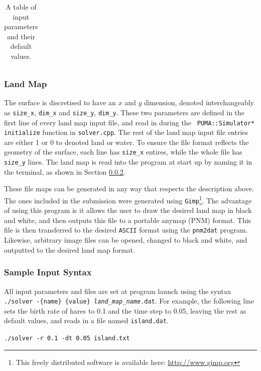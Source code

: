 \documentclass[a4paper,11pt]{article}
\begin{document}
{\begin{table}
\begin{tabular}{|l|l|l|l|}
\end{tabular}
\caption{A table of input parameters and their default values.}
\label{tb:parameters}
\end{table}


\subsubsection{Land Map}

The surface is discretised to have an $x$ and $y$ dimension, denoted interchangeably as \texttt{size\_x}, \texttt{dim\_x} and \texttt{size\_y}, \texttt{dim\_y}.  These two parameters are defined in the first line of every land map input file, and read in during the \texttt{ PUMA::Simulator* initialize} function in \texttt{solver.cpp}.  The rest of the land map input file entries are either 1 or 0 to denoted land or water.  To ensure the file format reflects the geometry of the surface, each line has \texttt{size\_x} entires, while the whole file has \texttt{size\_y} lines. The land map is read into the program at start up by naming it in the terminal, as shown in Section \ref{syntax}.

These file maps can be generated in any way that respects the description above.  The ones included in the submission were generated using \texttt{Gimp}\footnote{This freely distributed software is available here: \url{http://www.gimp.org}}.  The advantage of using this program is it allows the user to draw the desired land map in black and white, and then outputs this file to a portable anymap (PNM) format.  This file is then transferred to the desired \texttt{ASCII} format using the \texttt{pnm2dat} program.  Likewise, arbitrary image files can be opened, changed to black and white, and outputted to the desired land map format.

 
\subsubsection{Sample Input Syntax}\label{syntax}

All input parameters and files are set at program launch using the syntax \texttt{./solver -\{name\} \{value\} \emph{land\_map\_name}.dat}.  For example, the following line sets the birth rate of hares to 0.1 and the time step to 0.05, leaving the rest as default values, and reads in a file named \texttt{island.dat}.

\vspace{5pt}
\noindent\texttt{./solver -r 0.1 -dt 0.05 island.txt}

}
\end{document}
